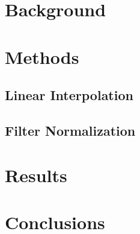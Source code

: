 \documentclass[a4paper]{scrartcl}
\begin{document}
\section*{Background}

\section*{Methods}
\subsection*{Linear Interpolation}
\subsection*{Filter Normalization}
\cite{xing2018walk}
\section*{Results}


\section*{Conclusions}




	
\end{document}
